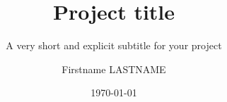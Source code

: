 \documentclass[
	fontsize=14pt, %
	twoside=false, %
	numbers=noenddot, %
]{kaobook}
\begin{document}

\subject{Course title}
\title{Project title}
\subtitle{A very short and explicit subtitle for your project}

\author{Firstname LASTNAME}

\date{\today}

\titlehead{\centering\texttt{[image: dvic.png]}}

\publishers{\textbf{Supervisior}\\ Clément Duhart or Marc Teyssier or Xiao Xiao }



\frontmatter %





	
	
	
\end{document}
